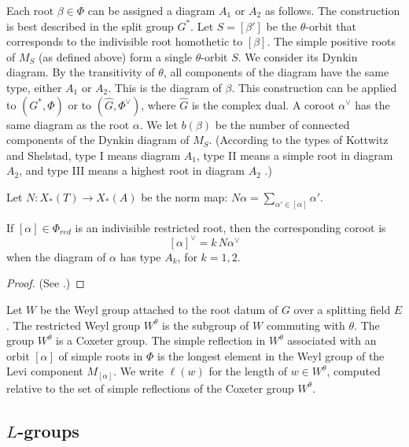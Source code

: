 Each root $\beta\in\Phi$ can be assigned a diagram $A_1$ or $A_2$ as
follows.  The construction is best described in the split group $G^*$.
Let $S=[\beta']$ be the $\theta$-orbit that corresponds to the
indivisible root homothetic to $[\beta]$.  The simple positive roots
of $M_S$ (as defined above) form a single $\theta$-orbit $S$.  We consider its Dynkin
diagram.  By the transitivity of $\theta$, all components of the
diagram have the same type, either $A_1$ or $A_2$.  This is the
diagram of $\beta$.  This construction can be applied to $(G^*,\Phi)$
or to $(\hat G,\Phi^\vee)$, where $\hat G$ is the complex dual.  A
coroot $\alpha^\vee$ has the same diagram as the root $\alpha$.  We let
$b(\beta)$ be the number of connected components of the Dynkin
diagram of $M_S$.  (According to the types of Kottwitz and Shelstad, type I
means diagram $A_1$, type II means a simple root in diagram $A_2$, and
type III means a highest root in diagram $A_2$
\cite{kottwitz1999foundations}.)

Let $N:X_*(T)\to X_*(A)$ be the norm map: 
$N\alpha = \sum_{\alpha'\in  [\alpha]} \alpha'$.

\begin{lemma}\label{lemma:norm}
 If $[\alpha]\in\Phi_{red}$ is an indivisible restricted root, then
  the corresponding coroot is
\begin{equation}\label{eqn:norm}
[\alpha]^\vee = k\, N\alpha^\vee
\end{equation}
when the diagram of $\alpha$ has type $A_k$, for $k=1,2$.
\end{lemma}

\begin{proof}
(See \cite[1.3.9]{kottwitz1999foundations}.)
\end{proof}

Let $W$ be the Weyl group attached to the root datum of $G$ over a
splitting field $E$.  The restricted Weyl group $W^\theta$ is the
subgroup of $W$ commuting with $\theta$.  The group $W^\theta$ is a
Coxeter group.  The simple reflection in $W^\theta$ associated with an
orbit $[\alpha]$ of simple roots in $\Phi$ is the longest element in
the Weyl group of the Levi component $M_{[\alpha]}$.  We write
$\ell(w)$ for the length of $w\in W^\theta$, computed relative to the
set of simple reflections of the Coxeter group $W^\theta$.

\subsection{$L$-groups}\label{sec:L}

